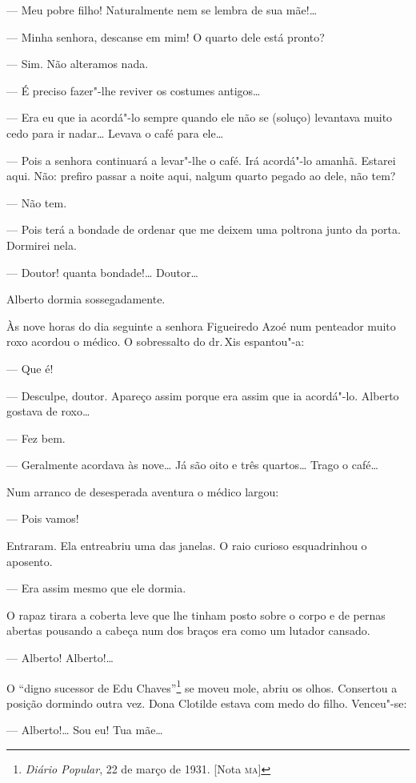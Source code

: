 --- Meu pobre filho! Naturalmente nem se lembra de sua mãe!\ldots{}

--- Minha senhora, descanse em mim! O quarto dele está pronto?

--- Sim. Não alteramos nada.

--- É preciso fazer"-lhe reviver os costumes antigos\ldots{}

--- Era eu que ia acordá"-lo sempre quando ele não se (soluço) levantava
muito cedo para ir nadar\ldots{} Levava o café para ele\ldots{}

--- Pois a senhora continuará a levar"-lhe o café. Irá acordá"-lo amanhã.
Estarei aqui. Não: prefiro passar a noite aqui, nalgum quarto pegado ao
dele, não tem?

--- Não tem.

--- Pois terá a bondade de ordenar que me deixem uma poltrona junto da
porta. Dormirei nela.

--- Doutor! quanta bondade!\ldots{} Doutor\ldots{}

Alberto dormia sossegadamente.

Às nove horas do dia seguinte a senhora Figueiredo Azoé num penteador
muito roxo acordou o médico. O sobressalto do dr.\,Xis espantou"-a:

--- Que é!

--- Desculpe, doutor. Apareço assim porque era assim que ia acordá"-lo.
Alberto gostava de roxo\ldots{}

--- Fez bem.

--- Geralmente acordava às nove\ldots{} Já são oito e três quartos\ldots{} Trago o
café\ldots{}

Num arranco de desesperada aventura o médico largou:

--- Pois vamos!

Entraram. Ela entreabriu uma das janelas. O raio curioso esquadrinhou o
aposento.

--- Era assim mesmo que ele dormia.

O rapaz tirara a coberta leve que lhe tinham posto sobre o corpo e de
pernas abertas pousando a cabeça num dos braços era como um lutador
cansado.

--- Alberto! Alberto!\ldots{}

O ``digno sucessor de Edu Chaves''\footnote{\emph{Diário Popular}, 22 de
  março de 1931. {[}Nota \textsc{ma}{]}} se moveu mole, abriu os olhos. Consertou
a posição dormindo outra vez. Dona Clotilde estava com medo do filho.
Venceu"-se:

--- Alberto!\ldots{} Sou eu! Tua mãe\ldots{}

